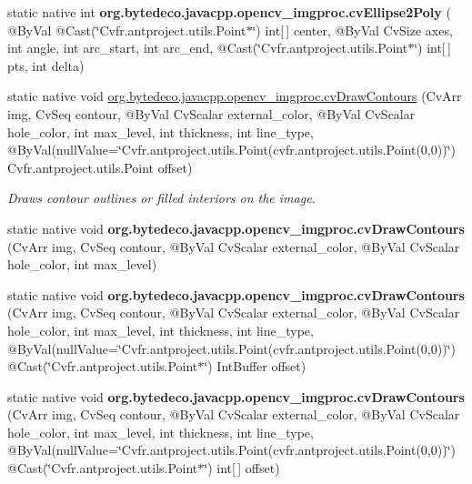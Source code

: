 \begin{DoxyCompactItemize}
\item 
\mbox{\label{group__imgproc__c_gab6478eae05a1f206e0458241a22caecb}} 
static native int {\bfseries org.\+bytedeco.\+javacpp.\+opencv\+\_\+imgproc.\+cv\+Ellipse2\+Poly} ( @By\+Val @Cast(\char`\"{}Cv\+fr.antproject.utils.Point$\ast$\char`\"{}) int\mbox{[}$\,$\mbox{]} center, @By\+Val Cv\+Size axes, int angle, int arc\+\_\+start, int arc\+\_\+end, @Cast(\char`\"{}Cv\+fr.antproject.utils.Point$\ast$\char`\"{}) int\mbox{[}$\,$\mbox{]} pts, int delta)
\item 
static native void \hyperlink{group__imgproc__c_ga225fad4fc8d41e9c4235b5b6e11de7c9}{org.\+bytedeco.\+javacpp.\+opencv\+\_\+imgproc.\+cv\+Draw\+Contours} (Cv\+Arr img, Cv\+Seq contour, @By\+Val Cv\+Scalar external\+\_\+color, @By\+Val Cv\+Scalar hole\+\_\+color, int max\+\_\+level, int thickness, int line\+\_\+type, @By\+Val(null\+Value=\char`\"{}Cv\+fr.antproject.utils.Point(cv\+fr.antproject.utils.Point(0,0))\char`\"{}) Cv\+fr.antproject.utils.Point offset)
\begin{DoxyCompactList}\small\item\em Draws contour outlines or filled interiors on the image. \end{DoxyCompactList}\item 
\mbox{\label{group__imgproc__c_gafbc9f12216854f56b55028b45522b928}} 
static native void {\bfseries org.\+bytedeco.\+javacpp.\+opencv\+\_\+imgproc.\+cv\+Draw\+Contours} (Cv\+Arr img, Cv\+Seq contour, @By\+Val Cv\+Scalar external\+\_\+color, @By\+Val Cv\+Scalar hole\+\_\+color, int max\+\_\+level)
\item 
\mbox{\label{group__imgproc__c_ga797bdb3aa06c72828c9f933faa248f80}} 
static native void {\bfseries org.\+bytedeco.\+javacpp.\+opencv\+\_\+imgproc.\+cv\+Draw\+Contours} (Cv\+Arr img, Cv\+Seq contour, @By\+Val Cv\+Scalar external\+\_\+color, @By\+Val Cv\+Scalar hole\+\_\+color, int max\+\_\+level, int thickness, int line\+\_\+type, @By\+Val(null\+Value=\char`\"{}Cv\+fr.antproject.utils.Point(cv\+fr.antproject.utils.Point(0,0))\char`\"{}) @Cast(\char`\"{}Cv\+fr.antproject.utils.Point$\ast$\char`\"{}) Int\+Buffer offset)
\item 
\mbox{\label{group__imgproc__c_ga013953d4d8afb4566966c9b8e6eaa57f}} 
static native void {\bfseries org.\+bytedeco.\+javacpp.\+opencv\+\_\+imgproc.\+cv\+Draw\+Contours} (Cv\+Arr img, Cv\+Seq contour, @By\+Val Cv\+Scalar external\+\_\+color, @By\+Val Cv\+Scalar hole\+\_\+color, int max\+\_\+level, int thickness, int line\+\_\+type, @By\+Val(null\+Value=\char`\"{}Cv\+fr.antproject.utils.Point(cv\+fr.antproject.utils.Point(0,0))\char`\"{}) @Cast(\char`\"{}Cv\+fr.antproject.utils.Point$\ast$\char`\"{}) int\mbox{[}$\,$\mbox{]} offset)
\end{DoxyCompactItemize}
